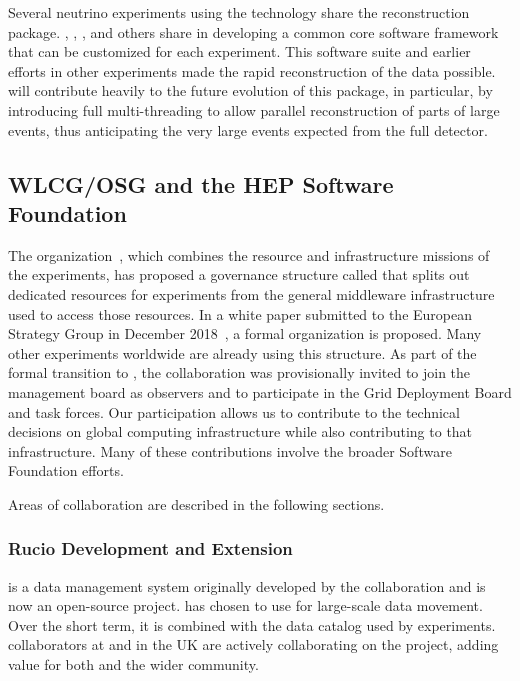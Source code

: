 Several neutrino experiments using the  technology share the \cite{Snider:2017wjd} reconstruction package.  , , , and others share in developing a common core software framework that can be customized for each experiment. This software suite and earlier efforts in other experiments made the rapid reconstruction of the  data possible.   will contribute heavily to  the future evolution of this package, in particular, by introducing full multi-threading to allow parallel reconstruction of parts of large events, thus anticipating the very large events expected from the full detector. 

\subsection{WLCG/OSG and the HEP Software Foundation}

The   organization~\cite{Bird:2014ctt}, which combines the resource and infrastructure missions of the  experiments, has proposed a governance structure called  that splits out dedicated resources for  experiments from the general middleware infrastructure used to access those resources.  In a white paper submitted to the European Strategy Group in December 2018~\cite{bib:BirdEUStrategy}, a formal  organization is proposed. Many other experiments worldwide are already using this structure.  As part of the formal transition to , the  collaboration was provisionally invited to join the  management board as observers and to participate in the Grid Deployment Board and task forces. Our participation allows us to contribute to the  technical decisions on global computing infrastructure while also contributing to that infrastructure. Many of these contributions involve the broader  Software Foundation efforts. 

Areas of collaboration are described in the following sections. 

\subsubsection{Rucio Development and Extension}

 \cite{Barisits:2019fyl}
is a data management system originally developed by the  collaboration and is now an open-source project.   has chosen to use  for large-scale data movement.  Over the short term, it is combined with the  data catalog used by  experiments.   collaborators at  and in the UK are actively collaborating on the  project, adding value for both  and the wider community. %


